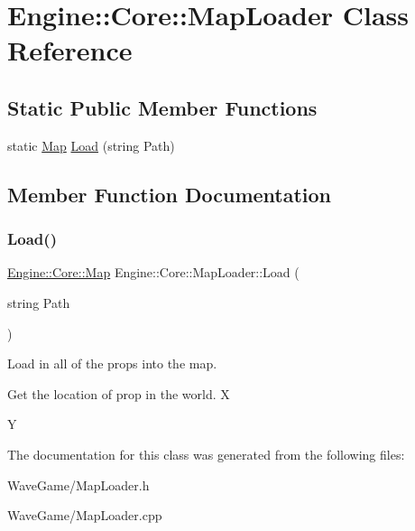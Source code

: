 \hypertarget{class_engine_1_1_core_1_1_map_loader}{}\section{Engine\+:\+:Core\+:\+:Map\+Loader Class Reference}
\label{class_engine_1_1_core_1_1_map_loader}
\subsection*{Static Public Member Functions}
\begin{DoxyCompactItemize}
\item 
static \hyperlink{class_engine_1_1_core_1_1_map}{Map} \hyperlink{class_engine_1_1_core_1_1_map_loader_af8d42cc4deb8d177be42b2e9b1277840}{Load} (string Path)
\end{DoxyCompactItemize}


\subsection{Member Function Documentation}
\mbox{\label{class_engine_1_1_core_1_1_map_loader_af8d42cc4deb8d177be42b2e9b1277840}} 
\subsubsection{\texorpdfstring{Load()}{Load()}}
{\footnotesize\ttfamily \hyperlink{class_engine_1_1_core_1_1_map}{Engine\+::\+Core\+::\+Map} Engine\+::\+Core\+::\+Map\+Loader\+::\+Load (\begin{DoxyParamCaption}\item[{string}]{Path }\end{DoxyParamCaption})\hspace{0.3cm}{\ttfamily [static]}}

Load in all of the props into the map.

Get the location of prop in the world. X

Y 

The documentation for this class was generated from the following files\+:\begin{DoxyCompactItemize}
\item 
Wave\+Game/Map\+Loader.\+h\item 
Wave\+Game/Map\+Loader.\+cpp\end{DoxyCompactItemize}
